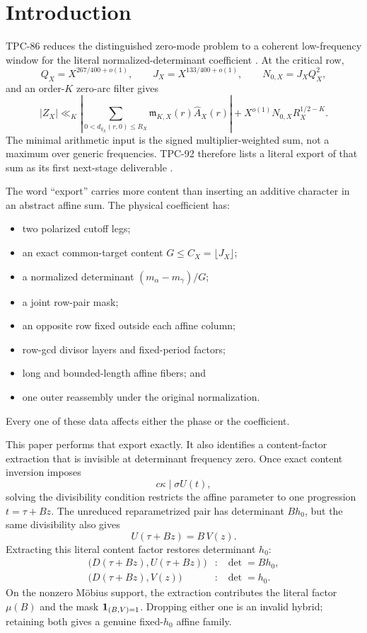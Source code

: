 \section{Introduction}
\label{sec:introduction}

TPC-86 reduces the distinguished zero-mode problem to a coherent
low-frequency window for the literal normalized-determinant
coefficient \citep{WangTPC86}.  At the critical row,
\[
 Q_X=X^{267/400+o(1)},\qquad
 J_X=X^{133/400+o(1)},\qquad
 N_{0,X}=J_XQ_X^2,
\]
and an order-\(K\) zero-arc filter gives
\begin{equation}
 |Z_X|
 \ll_K
 \left|
 \sum_{0<d_{q_X}(r,0)\le R_X}
 \mathfrak m_{K,X}(r)\widehat A_X(r)
 \right|
 +
 X^{o(1)}N_{0,X}R_X^{1/2-K}.
\label{eq:intro-low-window}
\end{equation}
The minimal arithmetic input is the signed multiplier-weighted sum,
not a maximum over generic frequencies.  TPC-92 therefore lists a
literal export of that sum as its first next-stage deliverable
\citep{WangTPC92}.

The word ``export'' carries more content than inserting an additive
character in an abstract affine sum.  The physical coefficient has:
\begin{itemize}[leftmargin=2em]
\item two polarized cutoff legs;
\item an exact common-target content \(G\le C_X=\lfloor J_X\rfloor\);
\item a normalized determinant
\((m_\alpha-m_\gamma)/G\);
\item a joint row-pair mask;
\item an opposite row fixed outside each affine column;
\item row-gcd divisor layers and fixed-period factors;
\item long and bounded-length affine fibers; and
\item one outer reassembly under the original normalization.
\end{itemize}
Every one of these data affects either the phase or the coefficient.

This paper performs that export exactly.  It also identifies a
content-factor extraction that is invisible at determinant frequency
zero.  Once exact content inversion imposes
\[
 c\kappa\mid \sigma U(t),
\]
solving the divisibility condition restricts the affine parameter to
one progression \(t=\tau+Bz\).  The unreduced reparametrized pair has
determinant \(Bh_0\), but the same divisibility also gives
\[
 U(\tau+Bz)=B\,V(z).
\]
Extracting this literal content factor restores determinant \(h_0\):
\[
\begin{array}{ccl}
\bigl(D(\tau+Bz),U(\tau+Bz)\bigr)
&:&\det=Bh_0,\\[1mm]
\bigl(D(\tau+Bz),V(z)\bigr)
&:&\det=h_0.
\end{array}
\]
On the nonzero M\"obius support, the extraction contributes the
literal factor \(\mu(B)\) and the mask \(\mathbf 1_{(B,V)=1}\).  Dropping
either one is an invalid hybrid; retaining both gives a genuine
fixed-\(h_0\) affine family.

